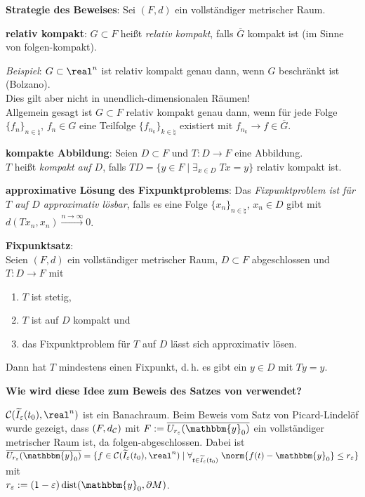 \linie

\textbf{Strategie des Beweises}:
Sei $(F, d)$ ein vollständiger metrischer Raum.

\textbf{relativ kompakt}:
$G \subset F$ heißt \emph{relativ kompakt}, falls $\overline{G}$ kompakt ist
(im Sinne von folgen-kompakt).

\emph{Beispiel}:
$G \subset \real^n$ ist relativ kompakt genau dann, wenn $G$ beschränkt ist
(Bolzano). \\
Dies gilt aber nicht in unendlich-dimensionalen Räumen! \\
Allgemein gesagt ist $G \subset F$ relativ kompakt genau dann, wenn für jede
Folge $\{f_n\}_{n \in \natural}$, $f_n \in G$ eine Teilfolge
$\{f_{n_k}\}_{k \in \natural}$ existiert mit $f_{n_k} \to f \in \overline{G}$.

\textbf{kompakte Abbildung}:
Seien $D \subset F$ und $T\colon D \rightarrow F$ eine Abbildung. \\
$T$ heißt \emph{kompakt auf $D$}, falls
$TD = \{y \in F \;|\; \exists_{x \in D}\; Tx = y\}$ relativ kompakt ist.

\textbf{approximative Lösung des Fixpunktproblems}:
Das \emph{Fixpunktproblem ist für $T$ auf $D$ approximativ lösbar},
falls es eine Folge $\{x_n\}_{n \in \natural}$, $x_n \in D$ gibt mit
$d(Tx_n, x_n) \xrightarrow{n \to \infty} 0$.

\textbf{Fixpunktsatz}: \\
Seien $(F, d)$ ein vollständiger metrischer Raum,
$D \subset F$ abgeschlossen und $T\colon D \rightarrow F$ mit
\begin{enumerate}
    \item
    $T$ ist stetig,
    
    \item
    $T$ ist auf $D$ kompakt und
    
    \item
    das Fixpunktproblem für $T$ auf $D$ lässt sich approximativ lösen.
\end{enumerate}
Dann hat $T$ mindestens einen Fixpunkt, d.\,h. es gibt ein $y \in D$ mit
$Ty = y$.

\linie
\pagebreak

\textbf{Wie wird diese Idee zum Beweis
des Satzes von  verwendet?}

$\C(\widetilde{I}_\varepsilon(t_0), \real^n)$ ist ein Banachraum.
Beim Beweis vom Satz von Picard-Lindelöf wurde gezeigt, dass $(F, d_{\mathcal{C}})$ mit
$F := \overline{U_{r_\varepsilon}(\mathbbm{y}_0)}$ ein vollständiger
metrischer Raum ist, da folgen-abgeschlossen.
Dabei ist $\overline{U_{r_\varepsilon}(\mathbbm{y}_0)} =
\{f \in \C(\widetilde{I}_\varepsilon(t_0), \real^n) \;|\;
\forall_{t \in \widetilde{I}_\varepsilon(t_0)}\;
\norm{f(t) - \mathbbm{y}_0} \le r_\varepsilon\}$ mit \\
$r_\varepsilon := (1 - \varepsilon) \dist(\mathbbm{y}_0, \partial M)$.

